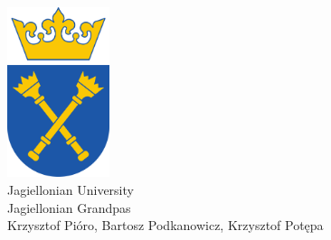 \pagestyle{empty}
\setcounter{page}{0}
\begin{center}
	\strut %
	\vspace{3cm}\\
	\includegraphics[width=3cm]{uj}\\
	{\fontsize{25}{30}\selectfont Jagiellonian University\\}
	{\fontsize{60}{60}\selectfont Jagiellonian Grandpas\\}
	\vspace{0.5cm}
	{\huge Krzysztof Pióro, Bartosz Podkanowicz, Krzysztof Potępa\\}
	\vfill
\end{center}
\clearpage
\pagestyle{fancy}
